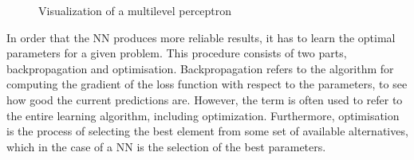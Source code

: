 \begin{figure}[htbp]
    \centering
    \caption{Visualization of a multilevel perceptron}
    \label{fig:MLP-Visualisation}
\end{figure}
\noindent
In order that the \gls{NN} produces more reliable results, it has to learn the optimal parameters for a given problem. This procedure consists of two parts, backpropagation and optimisation. Backpropagation refers to the algorithm for computing the gradient of the loss function with respect to the parameters, to see how good the current predictions are. However, the term is often used to refer to the entire learning algorithm, including optimization. Furthermore, optimisation is the process of selecting the best element from some set of available alternatives, which in the case of a \gls{NN} is the selection of the best parameters.
